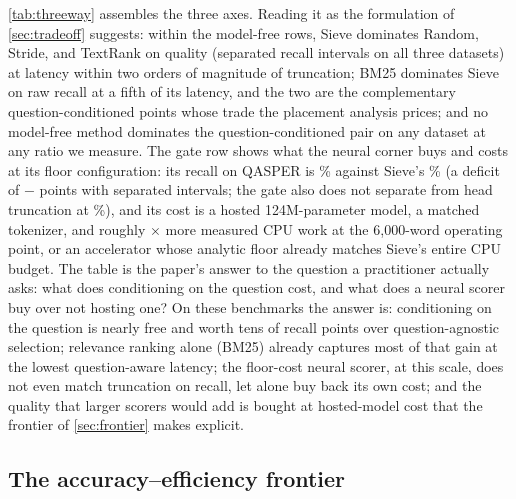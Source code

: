 \documentclass[preprint,12pt]{elsarticle}
\theoremstyle{remark}
\newcommand{\method}{Sieve}
\begin{document}
\autoref{tab:threeway} assembles the three axes. Reading it as the
formulation of \autoref{sec:tradeoff} suggests: within the model-free
rows, \method{} dominates Random, Stride, and TextRank on quality
(separated recall intervals on all three datasets) at latency within
two orders of magnitude of truncation; BM25 dominates \method{} on
raw recall at a fifth of its latency, and the two are the
complementary question-conditioned points whose trade the placement
analysis prices; and no model-free method dominates the
question-conditioned pair on any dataset at any ratio we measure. The
gate row shows what the neural corner buys and costs at its floor
configuration: its recall on QASPER is \GateRecall\% against
\method{}'s \RecQSie\% (a deficit of
\RecQSie{}$-$\GateRecall{} points with separated intervals; the gate
also does not separate from head truncation at \RecQHea\%), and its
cost is a hosted 124M-parameter model, a matched tokenizer, and
roughly \GateSieRatioSixk$\times$ more measured CPU work at the
6{,}000-word operating point, or an accelerator whose analytic floor
already matches \method{}'s entire CPU budget. The table is the
paper's answer to the question a practitioner actually asks: what
does conditioning on the question cost, and what does a neural scorer
buy over not hosting one? On these benchmarks the answer is:
conditioning on the question is nearly free and worth tens of recall
points over question-agnostic selection; relevance ranking alone
(BM25) already captures most of that gain at the lowest
question-aware latency; the floor-cost neural scorer, at this scale,
does not even match truncation on recall, let alone buy back its own
cost; and the quality that larger scorers would add is bought at
hosted-model cost that the frontier of \autoref{sec:frontier} makes
explicit.

\subsection{The accuracy--efficiency frontier}
\label{sec:frontier}
\end{document}
